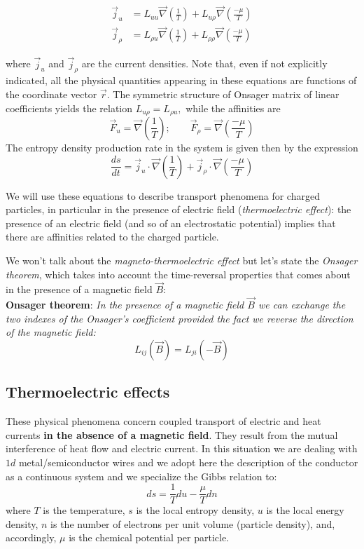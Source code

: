 \documentclass[\main/main.tex]{subfiles}
\begin{document}
\begin{align}
\vec{j}_{u} &=L_{u u} \vec{\nabla}\left(\frac{1}{T}\right)+L_{u \rho} \vec{\nabla}\left(\frac{-\mu}{T}\right) \\
\vec{j}_{\rho} &=L_{\rho u} \vec{\nabla}\left(\frac{1}{T}\right)+L_{\rho \rho} \vec{\nabla}\left(\frac{-\mu}{T}\right)
\end{align}

where $\vec{j}_{u}$ and $\vec{j}_{\rho}$ are the current densities. Note that, even if not explicitly indicated, all the physical quantities appearing in these equations are functions of the coordinate vector $\vec{r}$. The symmetric structure of Onsager matrix of linear coefficients yields the relation $L_{u \rho}=L_{\rho u},$ while the affinities are
\[
\vec{F}_{u} =\vec{\nabla}\left(\frac{1}{T}\right); \qquad
\vec{F}_{\rho} =\vec{\nabla}\left(\frac{-\mu}{T}\right)
\]
The entropy density production rate in the system is given then by the expression
\begin{equation}
  \frac{d s}{d t}=\vec{j}_{u} \cdot \vec{\nabla}\left(\frac{1}{T}\right)+\vec{j}_{\rho} \cdot \vec{\nabla}\left(\frac{-\mu}{T}\right)  
\end{equation}

We will use these equations to describe transport phenomena for charged particles, in particular in the presence of electric field (\textit{thermoelectric effect}): the presence of an electric field (and so of an electrostatic potential) implies that there are affinities related to the charged particle. 

\begin{appr}
We won't talk about the  \textit{magneto-thermoelectric effect} but let's state the \textit{Onsager theorem}, which takes into account the time-reversal properties that comes about in the presence of a magnetic field $\vec{B}$: \\

\textbf{Onsager theorem}: \textit{In the presence of a magnetic field $\vec{B}$ we can exchange the two indexes of the Onsager's coefficient provided the fact we reverse the direction of the magnetic field:}
\[
L_{ij}(\vec{B})=L_{ji}(-\vec{B})
\]
\end{appr}

\subsection{Thermoelectric effects}
These physical phenomena concern coupled transport of electric and heat currents \textbf{in the
absence of a magnetic field}. They result from the mutual interference of heat flow and
electric current. In this situation we are dealing with $1d$ metal/semiconductor wires and we adopt here the description of the conductor as a continuous system and
we specialize the Gibbs relation to:
\begin{equation}
    d s=\frac{1}{T} d u-\frac{\mu}{T} d n
\end{equation}
where $T$ is the temperature, $s$ is the local entropy density, $u$ is the local energy density,
$n$ is the number of electrons per unit volume (particle density), and, accordingly, $\mu$ is the chemical potential per particle.
\end{document}
